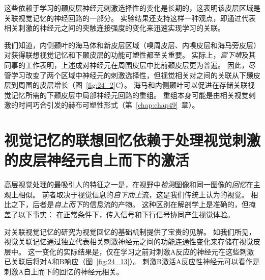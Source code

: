 这些依赖于学习的颞皮层神经元刺激选择性的变化是长期的，这表明该皮层区域是关联视觉记忆的神经回路的一部分。
实验结果还支持这样一种观点，即通过代表相关刺激的神经元之间的突触连接强度的变化来迅速实现学习的关联。


我们知道，内侧颞叶的海马体和新皮层区域（嗅周皮层、内嗅皮层和海马旁皮层）对获得联想视觉记忆和下颞皮层的功能可塑性都至关重要。
实际上，\textit{宫下靖}及其同事的工作表明，上述成对神经元在周围皮层中比前颞皮层更为普遍。
因此，尽管学习改变了两个区域中神经元的刺激选择性，但视觉相关对之间的关联从下颞皮层到周围的皮层增长（图~\ref{fig:24_2}C）。
海马和内侧颞叶可以促进在存储关联视觉记忆所需的下颞皮层中局部神经元回路的重组。
重组本身可能是由相关视觉刺激的时间巧合引发的赫布可塑性形式（第~\ref{chap:chap49}~章）。



\section{视觉记忆的联想回忆依赖于处理视觉刺激的皮层神经元自上而下的激活}

高层视觉处理的最吸引人的特征之一是，在视野中\textit{检测}图像和同一图像的\textit{回忆}在主观上相似。
前者取决于视觉信息的\textit{自下而上}流，这是我们传统上认为的视觉。
相比之下，后者是\textit{自上而下}的信息流的产物。
这种区别在解剖学上是准确的，但掩盖了以下事实：
在正常条件下，传入信号和下行信号协同产生视觉体验。


对关联视觉记忆的研究为视觉回忆的基础机制提供了宝贵的见解。
如我们所见，视觉关联记忆通过独立代表相关刺激神经元之间的功能连通性变化来存储在视觉皮层中。
这一变化的实际结果是，仅在学习之前对刺激A反应的神经元在这些刺激已关联后将对A和B响应（图~\ref{fig:24_13}）。
刺激B激活A反应性神经元可以看作是刺激A自上而下的回忆的神经元相关。


